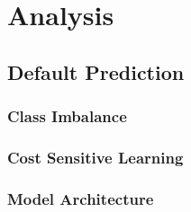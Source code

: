 \chapter{Analysis}\label{ch:5}






    \section{Default Prediction}
    
        \subsection{Class Imbalance}
        
        \subsection{Cost Sensitive Learning}
        
        \subsection{Model Architecture}
